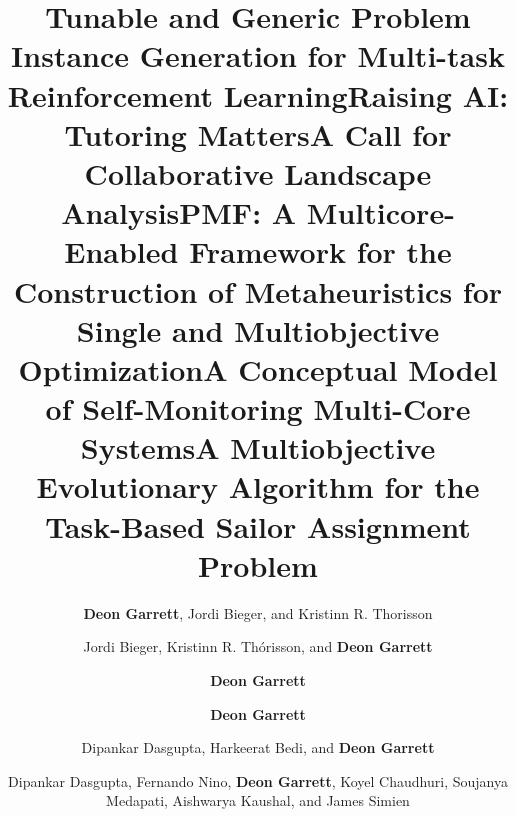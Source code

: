 \documentclass[a4paper,10pt]{cvclean}
\begin{document}
\begin{publications}
  \begin{conferencepapers}
    \begin{paper}
      \title{Tunable and Generic Problem Instance Generation for Multi-task
        Reinforcement Learning}
      \author{\textbf{Deon Garrett}, Jordi Bieger, and Kristinn R. Thorisson}
    \end{paper}
    \begin{paper}
      \title{Raising AI: Tutoring Matters}
      \author{Jordi Bieger, Kristinn R. Thórisson, and \textbf{Deon Garrett}}
    \end{paper}
    \begin{paper}
      \title{A Call for Collaborative Landscape Analysis}
      \author{\textbf{Deon Garrett}}
    \end{paper}
    \begin{paper}
      \title{PMF: A Multicore-Enabled Framework for the Construction of
        Metaheuristics for Single and Multiobjective Optimization}
      \author{\textbf{Deon Garrett}}
    \end{paper}
    \begin{paper}
      \title{A Conceptual Model of Self-Monitoring Multi-Core Systems}
      \author{Dipankar Dasgupta, Harkeerat Bedi, and \textbf{Deon Garrett}}
    \end{paper}
    \begin{paper}
      \title{A Multiobjective Evolutionary Algorithm for the Task-Based Sailor
        Assignment Problem}
      \author{Dipankar Dasgupta, Fernando Nino, \textbf{Deon Garrett}, Koyel Chaudhuri,
        Soujanya Medapati, Aishwarya Kaushal, and James Simien}

\end{paper}
\end{conferencepapers}
\end{publications}
\end{document}
